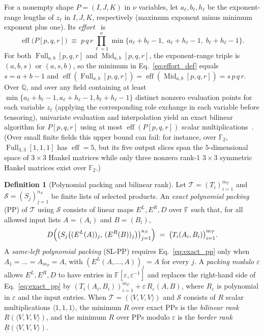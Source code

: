 \documentclass[11pt,a4paper]{article}
\theoremstyle{plain}
\theoremstyle{definition}
\newtheorem{definition}[theorem]{Definition}
\theoremstyle{remark}
\newcommand{\Q}{\mathbb{Q}}
\newcommand{\F}{\mathbb{F}}
\DeclareMathOperator{\Full}{Full}
\DeclareMathOperator{\Mid}{Mid}
\DeclareMathOperator{\eff}{eff}
\begin{document}
For a nonempty shape $P = (I, J, K)$ in $\nu$ variables, let $a_\ell, b_\ell, h_\ell$ be the exponent-range lengths of $z_\ell$ in $I, J, K$, respectively (maximum exponent minus minimum exponent plus one). Its \emph{effort}~\cite{Pass2026} is
\begin{equation}
    \eff\bigl(P[p, q, r]\bigr) \;\equiv\; p \, q \, r \prod_{\ell=1}^\nu \min\{a_\ell + b_\ell - 1,\; a_\ell + h_\ell - 1,\; b_\ell + h_\ell - 1\} .
    \label{eq:effort_def}
\end{equation}
For both $\Full_{a,b}[p,q,r]$ and $\Mid_{a,b}[p,q,r]$, the exponent-range triple is $(a, b, s)$ or $(a, s, b)$, so the minimum in Eq.~\eqref{eq:effort_def} equals $s = a + b - 1$ and $\eff(\Full_{a,b}[p,q,r]) = \eff(\Mid_{a,b}[p,q,r]) = s\,p\,q\,r$. Over $\Q$, and over any field containing at least $\min\{a_\ell + b_\ell - 1, a_\ell + h_\ell - 1, b_\ell + h_\ell - 1\}$ distinct nonzero evaluation points for each variable $z_\ell$ (applying the corresponding role exchange in each variable before tensoring), univariate evaluation and interpolation yield an exact bilinear algorithm for $P[p,q,r]$ using at most $\eff(P[p,q,r])$ scalar multiplications~\cite[Lemma~2.3]{Pass2026}. (Over small finite fields this upper bound can fail: for instance, over $\F_2$, $\Full_{3,3}[1,1,1]$ has $\eff = 5$, but its five output slices span the $5$-dimensional space of $3 \times 3$ Hankel matrices while only three nonzero rank-$1$ $3 \times 3$ symmetric Hankel matrices exist over $\F_2$.)

\begin{definition}[Polynomial packing and bilinear rank]
\label{def:packing}
Let $\mathcal{T} = (T_i)_{i=1}^{m_T}$ and $\mathcal{S} = (S_j)_{j=1}^{n_S}$ be finite lists of selected products. An \emph{exact polynomial packing} (PP) of $\mathcal{T}$ using $\mathcal{S}$ consists of linear maps $E^L, E^R, D$ over $\F$ such that, for all allowed input lists $A = (A_i)$ and $B = (B_i)$,
\begin{equation}
    D\Bigl(\bigl(S_j\bigl((E^L(A))_j,\,(E^R(B))_j\bigr)\bigr)_{j=1}^{n_S}\Bigr) \;=\; \bigl(T_i(A_i, B_i)\bigr)_{i=1}^{m_T} .
    \label{eq:exact_pp}
\end{equation}
A \emph{same-left polynomial packing} (SL-PP) requires Eq.~\eqref{eq:exact_pp} only when $A_1 = \dots = A_{m_T} = A$, with $(E^L(A, \dots, A))_j = A$ for every $j$. A \emph{packing modulo $\varepsilon$} allows $E^L, E^R, D$ to have entries in $\F[\varepsilon, \varepsilon^{-1}]$ and replaces the right-hand side of Eq.~\eqref{eq:exact_pp} by $(T_i(A_i, B_i))_{i=1}^{m_T} + \varepsilon \, R_\varepsilon(A, B)$, where $R_\varepsilon$ is polynomial in $\varepsilon$ and the input entries. When $\mathcal{T} = (\langle V, V, V\rangle)$ and $\mathcal{S}$ consists of $R$ scalar multiplications $\langle 1, 1, 1\rangle$, the minimum $R$ over exact PPs is the \emph{bilinear rank} $R(\langle V, V, V\rangle)$, and the minimum $R$ over PPs modulo $\varepsilon$ is the \emph{border rank} $\underline{R}(\langle V, V, V\rangle)$.
\end{definition}
\end{document}
